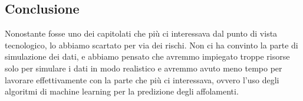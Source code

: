 \documentclass[../studio-di-fattibilita.tex]{subfiles}
\begin{document}
\subsection{Conclusione}%
\label{sub:conclusione}
Nonostante fosse uno dei capitolati che più ci interessava dal punto di vista tecnologico, lo abbiamo scartato per via dei rischi. Non ci ha convinto la parte di simulazione dei dati, e abbiamo pensato che avremmo impiegato troppe risorse solo per simulare i dati in modo realistico e avremmo avuto meno tempo per lavorare effettivamente con la parte che più ci interessava, ovvero l’uso degli algoritmi di machine learning per la predizione degli affolamenti.
\end{document}
